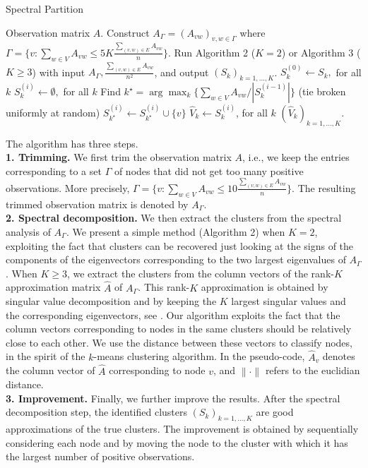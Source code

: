 \begin{algorithm}[t!]
   \caption{Spectral Partition}
   \label{alg:partition}
\begin{algorithmic}
 Observation matrix $A$.
 Construct $A_{\Gamma}=(A_{vw})_{v,w\in \Gamma}$ where $\Gamma = \{v:
  \sum_{w \in V} A_{vw} \le 5K \frac{\sum_{(v,w) \in E } A_{vw}}{n} \}$.
 Run Algorithm 2 ($K=2$) or Algorithm 3 ($K\ge 3$)
\STATE with input $A_{\Gamma}, \frac{ \sum_{(v,w) \in E } A_{vw} }{n^2}$, and output $(S_k)_{k=1,\ldots,K}$.
   \STATE $S^{(0)}_k \leftarrow S_k ,$ for all $k$
     \STATE $S^{(i)}_k \leftarrow \emptyset ,$ for all $k$
  \STATE Find $k^{\star} = \arg \max_{k} \{\sum_{w \in V} A_{vw} / |
  S^{(i-1)}_k | \} $ (tie broken uniformly at random)
   \STATE $S^{(i)}_{k^{\star}} \leftarrow S^{(i)}_{k^{\star}} \cup \{ v \}$
   \ENDFOR
   \ENDFOR
\STATE $\hat{V}_k \leftarrow S_k^{(i)}$, for all $k$
    $(\hat{V}_k)_{k=1,\ldots,K}$.
\end{algorithmic}
\end{algorithm}


The algorithm has three steps. \\
{\bf 1. Trimming.} We first trim the observation matrix $A$, i.e., we keep the entries corresponding to a set $\Gamma$ of nodes that did not get too many positive observations. More precisely, $\Gamma = \{v: \sum_{w \in V} A_{vw} \le 10 \frac{\sum_{(v,w) \in E } A_{vw}}{n} \} $. The resulting trimmed observation matrix is denoted by $A_\Gamma$. \\
{\bf 2. Spectral decomposition.} We then extract the clusters from the spectral analysis of $A_\Gamma$. We present a simple method (Algorithm 2) when $K=2$, exploiting the fact that clusters can be recovered just looking at the signs of the components of the eigenvectors corresponding to the two largest eigenvalues of $A_\Gamma$. When $K\ge 3$, we extract the clusters from the column vectors of the rank-$K$ approximation matrix $\hat{A}$ of $A_\Gamma$. This rank-$K$ approximation is obtained by singular value decomposition and by keeping the $K$ largest singular values and the corresponding eigenvectors, see \cite{chatterjee2012}. Our algorithm exploits the fact that the column vectors corresponding to nodes in the same clusters should be relatively close to each other. We use the distance between these vectors to classify nodes, in the spirit of the $k$-means clustering algorithm. In the pseudo-code, $\hat{A}_v$ denotes the column vector of $\hat{A}$ corresponding to node $v$, and $\|\cdot\|$ refers to the euclidian distance.\\
{\bf 3. Improvement.} Finally, we further improve the results. After the spectral decomposition step, the identified clusters $(S_k)_{k=1,\ldots,K}$ are good approximations of the true clusters. The improvement is obtained by sequentially considering each node and by moving the node to the cluster with which it has the largest number of positive observations.

